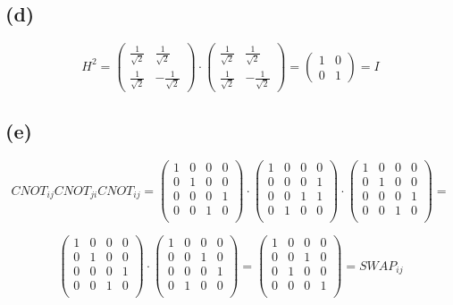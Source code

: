 \documentclass{article}
\begin{document}
\subsection*{(d)}

$$
H^2=
\begin{pmatrix}
\frac{1}{\sqrt{2}} & \frac{1}{\sqrt{2}} \\
\frac{1}{\sqrt{2}} & -\frac{1}{\sqrt{2}}
\end{pmatrix}\cdot
\begin{pmatrix}
\frac{1}{\sqrt{2}} & \frac{1}{\sqrt{2}} \\
\frac{1}{\sqrt{2}} & -\frac{1}{\sqrt{2}}
\end{pmatrix}=
\begin{pmatrix}
1 & 0 \\
0 & 1
\end{pmatrix}=I
$$

\subsection*{(e)}

$$
CNOT_{ij}CNOT_{ji}CNOT_{ij}=
\begin{pmatrix}
1 & 0 & 0 & 0 \\
0 & 1 & 0 & 0 \\
0 & 0 & 0 & 1 \\
0 & 0 & 1 & 0 \\
\end{pmatrix}\cdot
\begin{pmatrix}
1 & 0 & 0 & 0 \\
0 & 0 & 0 & 1 \\
0 & 0 & 1 & 1 \\
0 & 1 & 0 & 0 \\
\end{pmatrix}\cdot
\begin{pmatrix}
1 & 0 & 0 & 0 \\
0 & 1 & 0 & 0 \\
0 & 0 & 0 & 1 \\
0 & 0 & 1 & 0 \\
\end{pmatrix}=
$$

$$
\begin{pmatrix}
1 & 0 & 0 & 0 \\
0 & 1 & 0 & 0 \\
0 & 0 & 0 & 1 \\
0 & 0 & 1 & 0 \\
\end{pmatrix}\cdot
\begin{pmatrix}
1 & 0 & 0 & 0 \\
0 & 0 & 1 & 0 \\
0 & 0 & 0 & 1 \\
0 & 1 & 0 & 0 \\
\end{pmatrix}=
\begin{pmatrix}
1 & 0 & 0 & 0 \\
0 & 0 & 1 & 0 \\
0 & 1 & 0 & 0 \\
0 & 0 & 0 & 1 \\
\end{pmatrix}=
SWAP_{ij}
$$
\end{document}
